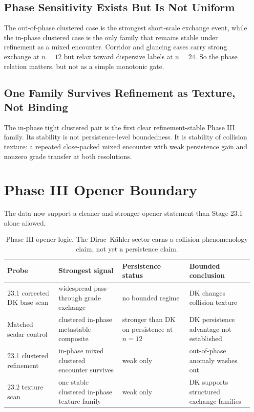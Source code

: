 \documentclass[11pt]{article}
\begin{document}
\subsection{Phase Sensitivity Exists But Is Not Uniform}

The out-of-phase clustered case is the strongest short-scale exchange event, while the in-phase clustered case is the only family that remains stable under refinement as a mixed encounter. Corridor and glancing cases carry strong exchange at $n=12$ but relax toward dispersive labels at $n=24$. So the phase relation matters, but not as a simple monotonic gate.

\subsection{One Family Survives Refinement as Texture, Not Binding}

The in-phase tight clustered pair is the first clear refinement-stable Phase III family. Its stability is not persistence-level boundedness. It is stability of collision texture: a repeated close-packed mixed encounter with weak persistence gain and nonzero grade transfer at both resolutions.

\section{Phase III Opener Boundary}

The data now support a cleaner and stronger opener statement than Stage 23.1 alone allowed.

\begin{table}[h]
\centering
\small
\begin{tabular}{@{}p{2.2in}p{1.4in}p{1.0in}p{1.4in}@{}}
\toprule
Probe & Strongest signal & Persistence status & Bounded conclusion \\
\midrule
23.1 corrected DK base scan & widespread pass-through grade exchange & no bounded regime & DK changes collision texture \\
Matched scalar control & clustered in-phase metastable composite & stronger than DK on persistence at $n=12$ & DK persistence advantage not established \\
23.1 clustered refinement & in-phase mixed clustered encounter survives & weak only & out-of-phase anomaly washes out \\
23.2 texture scan & one stable clustered in-phase texture family & weak only & DK supports structured exchange families \\
\bottomrule
\end{tabular}
\caption{Phase III opener logic. The Dirac--K\"ahler sector earns a collision-phenomenology claim, not yet a persistence claim.}
\end{table}
\end{document}
